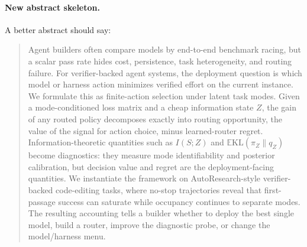 \documentclass{article}
\providecommand{\KL}{\mathrm{KL}}
\begin{document}
\paragraph{New abstract skeleton.}
A better abstract should say:
\begin{quote}
Agent builders often compare models by end-to-end benchmark racing, but a scalar pass
rate hides cost, persistence, task heterogeneity, and routing failure.
For verifier-backed agent systems, the deployment question is which model or harness action
minimizes verified effort on the current instance.
We formulate this as finite-action selection under latent task modes.
Given a mode-conditioned loss matrix and a cheap information state \(Z\), the gain of any
routed policy decomposes exactly into routing opportunity, the value of the signal for action
choice, minus learned-router regret.
Information-theoretic quantities such as \(I(S;Z)\) and
\(\mathbb E\KL(\pi_Z\|q_Z)\) become diagnostics: they measure mode identifiability and
posterior calibration, but decision value and regret are the deployment-facing quantities.
We instantiate the framework on AutoResearch-style verifier-backed code-editing tasks,
where no-stop trajectories reveal that first-passage success can saturate while occupancy
continues to separate modes.
The resulting accounting tells a builder whether to deploy the best single model, build a
router, improve the diagnostic probe, or change the model/harness menu.
\end{quote}
\end{document}
